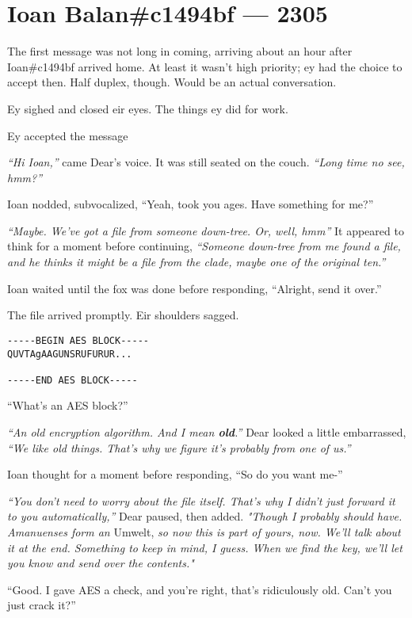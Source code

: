 \chapter*{Ioan Balan\#c1494bf — 2305}

\noindent The first message was not long in coming, arriving about an hour after Ioan\#c1494bf arrived home. At least it wasn't high priority; ey had the choice to accept then. Half duplex, though. Would be an actual conversation.

Ey sighed and closed eir eyes. The things ey did for work.

Ey accepted the message

\emph{``Hi Ioan,''} came Dear's voice. It was still seated on the couch. \emph{``Long time no see, hmm?''}

Ioan nodded, subvocalized, ``Yeah, took you ages. Have something for me?''

\emph{``Maybe. We've got a file from someone down-tree. Or, well, hmm''} It appeared to think for a moment before continuing, \emph{``Someone down-tree from me found a file, and he thinks it might be a file from the clade, maybe one of the original ten.''}

Ioan waited until the fox was done before responding, ``Alright, send it over.''

The file arrived promptly. Eir shoulders sagged.

\begin{verbatim}
-----BEGIN AES BLOCK-----
QUVTAgAAGUNSRUFURUR...

-----END AES BLOCK-----
\end{verbatim}

``What's an AES block?''

\emph{``An old encryption algorithm. And I mean \textbf{old}.''} Dear looked a little embarrassed, \emph{``We like old things. That's why we figure it's probably from one of us.''}

Ioan thought for a moment before responding, ``So do you want me-''

\emph{``You don't need to worry about the file itself. That's why I didn't just forward it to you automatically,''} Dear paused, then added. \emph{"Though I probably should have. Amanuenses form an} Umwelt, \emph{so now this is part of yours, now. We'll talk about it at the end. Something to keep in mind, I guess. When we find the key, we'll let you know and send over the contents."}

``Good. I gave AES a check, and you're right, that's ridiculously old. Can't you just crack it?''


